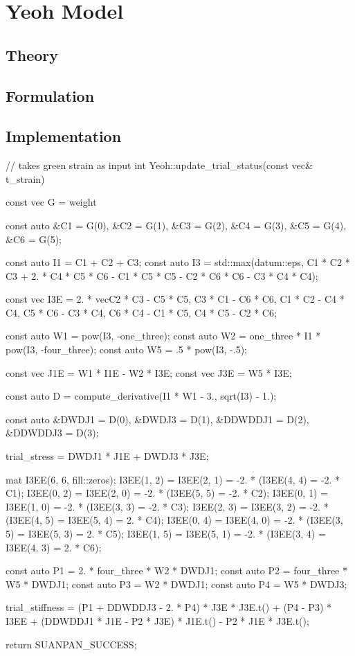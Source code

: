 \section{Yeoh Model}
\subsection{Theory}
\subsection{Formulation}
\subsection{Implementation}
\begin{cppcode}
// takes green strain as input
int Yeoh::update_trial_status(const vec& t_strain) {
    const vec G = weight %

    const auto &C1 = G(0), &C2 = G(1), &C3 = G(2), &C4 = G(3), &C5 = G(4), &C6 = G(5);

    const auto I1 = C1 + C2 + C3;
    const auto I3 = std::max(datum::eps, C1 * C2 * C3 + 2. * C4 * C5 * C6 - C1 * C5 * C5 - C2 * C6 * C6 - C3 * C4 * C4);

    const vec I3E = 2. * vec{C2 * C3 - C5 * C5, C3 * C1 - C6 * C6, C1 * C2 - C4 * C4, C5 * C6 - C3 * C4, C6 * C4 - C1 * C5, C4 * C5 - C2 * C6};

    const auto W1 = pow(I3, -one_three);
    const auto W2 = one_three * I1 * pow(I3, -four_three);
    const auto W5 = .5 * pow(I3, -.5);

    const vec J1E = W1 * I1E - W2 * I3E;
    const vec J3E = W5 * I3E;

    const auto D = compute_derivative(I1 * W1 - 3., sqrt(I3) - 1.);

    const auto &DWDJ1 = D(0), &DWDJ3 = D(1), &DDWDDJ1 = D(2), &DDWDDJ3 = D(3);

    trial_stress = DWDJ1 * J1E + DWDJ3 * J3E;

    mat I3EE(6, 6, fill::zeros);
    I3EE(1, 2) = I3EE(2, 1) = -2. * (I3EE(4, 4) = -2. * C1);
    I3EE(0, 2) = I3EE(2, 0) = -2. * (I3EE(5, 5) = -2. * C2);
    I3EE(0, 1) = I3EE(1, 0) = -2. * (I3EE(3, 3) = -2. * C3);
    I3EE(2, 3) = I3EE(3, 2) = -2. * (I3EE(4, 5) = I3EE(5, 4) = 2. * C4);
    I3EE(0, 4) = I3EE(4, 0) = -2. * (I3EE(3, 5) = I3EE(5, 3) = 2. * C5);
    I3EE(1, 5) = I3EE(5, 1) = -2. * (I3EE(3, 4) = I3EE(4, 3) = 2. * C6);

    const auto P1 = 2. * four_three * W2 * DWDJ1;
    const auto P2 = four_three * W5 * DWDJ1;
    const auto P3 = W2 * DWDJ1;
    const auto P4 = W5 * DWDJ3;

    trial_stiffness = (P1 + DDWDDJ3 - 2. * P4) * J3E * J3E.t() + (P4 - P3) * I3EE + (DDWDDJ1 * J1E - P2 * J3E) * J1E.t() - P2 * J1E * J3E.t();

    return SUANPAN_SUCCESS;
}
\end{cppcode}